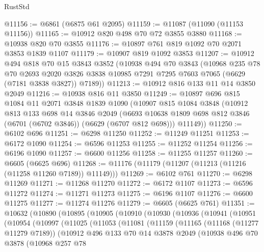 \begin{lexlean}{RustStd}
\begin{coremodule}
@11156 := @6861 (@6875 @61 @2095)
@11159 := @11087 (@11090 (@11153 @11156))
@11165 := @10912 @820 @498 @70 @72 @3855 @3880
@11168 := @10938 @820 @70 @3855
@11176 := @10897 @761 @819 @1092 @70 @2071 @3853 @1839 @1107
@11179 := @10907 @819 @1092 @3853
@11207 := @10912
    @494
    @818
    @70
    @15
    @3843
    @3852
    (@10938
      @494
      @70
      @3843
      (@10968
        @235
        @78
        @70
        @2693
        @2020
        @3826
        @3838
        @10985
        @7291
        @7295
        @7603
        @7065
        (@6629 (@7181 @3838 @3827))
        @7189))
@11213 := @10912 @816 @133 @11 @14 @3850 @2049
@11216 := @10938 @816 @11 @3850
@11249 := @10897
    @696
    @815
    @1084
    @11
    @2071
    @3848
    @1839
    @1090
    (@10907
      @815
      @1084
      @3848
      (@10912
        @813
        @133
        @698
        @14
        @3846
        @2049
        (@6693 @10638 @1809 @698 @812 @3846 (@6701 (@6702 @3846)) (@6629 (@6707 @812 @698)))
        @11149))
@11250 := @6102 @696
@11251 := @6298 @11250
@11252 := @11249 @11251
@11253 := @6172 @1090
@11254 := @6596 @11253
@11255 := @11252 @11254
@11256 := @6196 @1090
@11257 := @6600 @11256
@11258 := @11255 @11257
@11260 := @6605 (@6625 @696)
@11268 := @11176 (@11179 (@11207 (@11213 (@11216 (@11258 @11260 @7189)) @11149)))
@11269 := @6102 @761
@11270 := @6298 @11269
@11271 := @11268 @11270
@11272 := @6172 @1107
@11273 := @6596 @11272
@11274 := @11271 @11273
@11275 := @6196 @1107
@11276 := @6600 @11275
@11277 := @11274 @11276
@11279 := @6605 (@6625 @761)
@11351 := @10632
    (@10890
      (@10895
        (@10905
          (@10910
            (@10930
              (@10936
                (@10941
                  (@10951
                    (@10954
                      (@10997
                        (@11025
                          (@11053
                            (@11081
                              (@11159
                                (@11165
                                  (@11168 (@11277 @11279 @7189))
                                  (@10912
                                    @496
                                    @133
                                    @70
                                    @14
                                    @3878
                                    @2049
                                    (@10938
                                      @496
                                      @70
                                      @3878
                                      (@10968
                                        @257
                                        @78

\end{coremodule}
\end{lexlean}
